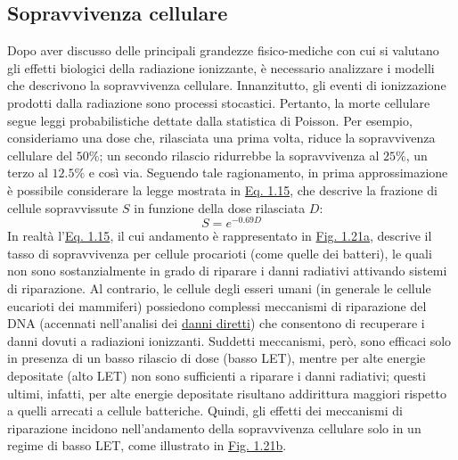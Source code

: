 \documentclass[12pt,a4paper,twoside]{report}
\begin{document}
	\subsection{Sopravvivenza cellulare}\label{sec:sopravvivenza_cellulare}
	Dopo aver discusso delle principali grandezze fisico-mediche con cui si valutano gli effetti biologici della radiazione ionizzante, è necessario analizzare i modelli che descrivono la sopravvivenza cellulare. Innanzitutto, gli eventi di ionizzazione prodotti dalla radiazione sono processi stocastici. Pertanto, la morte cellulare segue leggi probabilistiche dettate dalla statistica di Poisson. Per esempio, consideriamo una dose che, rilasciata una prima volta, riduce la sopravvivenza cellulare del $50\%$; un secondo rilascio ridurrebbe la sopravvivenza al $25\%$, un terzo al $12.5\%$ e così via. Seguendo tale ragionamento, in prima approssimazione è possibile considerare la legge mostrata in \hyperref[eq:survival1]{Eq. 1.15}, che descrive la frazione di cellule sopravvissute $S$ in funzione della dose rilasciata $D$:
	\begin{equation}
		S=e^{-0.69D}
		\label{eq:survival1}
	\end{equation}
	In realtà l'\hyperref[eq:survival1]{Eq. 1.15}, il cui andamento è rappresentato in \hyperref[fig:survival1]{Fig. 1.21a}, descrive il tasso di sopravvivenza per cellule procarioti (come quelle dei batteri), le quali non sono sostanzialmente in grado di riparare i danni radiativi attivando sistemi di riparazione. Al contrario, le cellule degli esseri umani (in generale le cellule eucarioti dei mammiferi) possiedono complessi meccanismi di riparazione del DNA (accennati nell'analisi dei \hyperref[par:danno_diretto]{danni diretti}) che consentono di recuperare i danni dovuti a radiazioni ionizzanti. Suddetti meccanismi, però, sono efficaci solo in presenza di un basso rilascio di dose (basso LET), mentre per alte energie depositate (alto LET) non sono sufficienti a riparare i danni radiativi; questi ultimi, infatti, per alte energie depositate risultano addirittura maggiori rispetto a quelli arrecati a cellule batteriche. Quindi, gli effetti dei meccanismi di riparazione incidono nell'andamento della sopravvivenza cellulare solo in un regime di basso LET, come illustrato in \hyperref[fig:survival2]{Fig. 1.21b}.
\end{document}
